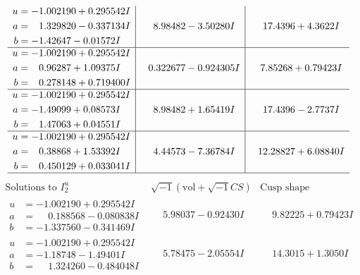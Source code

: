 \documentclass[1p]{elsarticle_modified}
\theoremstyle{definition}
\newcommand{\I}{\sqrt{-1}}
\begin{document}
$$\begin{array}{c|c|c}
\begin{aligned}
u &= -1.002190 + 0.295542 I \\
a &= \phantom{-}1.329820 - 0.337134 I \\
b &= -1.42647 - 0.01572 I\end{aligned}
 & \phantom{-}8.98482 - 3.50280 I & \phantom{-}17.4396 + 4.3622 I \\ \hline\begin{aligned}
u &= -1.002190 + 0.295542 I \\
a &= \phantom{-}0.96287 + 1.09375 I \\
b &= \phantom{-}0.278148 + 0.719400 I\end{aligned}
 & \phantom{-}0.322677 - 0.924305 I & \phantom{-}7.85268 + 0.79423 I \\ \hline\begin{aligned}
u &= -1.002190 + 0.295542 I \\
a &= -1.49099 + 0.08573 I \\
b &= \phantom{-}1.47063 + 0.04551 I\end{aligned}
 & \phantom{-}8.98482 + 1.65419 I & \phantom{-}17.4396 - 2.7737 I \\ \hline\begin{aligned}
u &= -1.002190 + 0.295542 I \\
a &= \phantom{-}0.38868 + 1.53392 I \\
b &= \phantom{-}0.450129 + 0.033041 I\end{aligned}
 & \phantom{-}4.44573 - 7.36784 I & \phantom{-}12.28827 + 6.08840 I\\
 \hline 
 \end{array}$$\newpage$$\begin{array}{c|c|c}  
\text{Solutions to }I^u_{2}& \I (\text{vol} + \sqrt{-1}CS) & \text{Cusp shape}\\
 \hline 
\begin{aligned}
u &= -1.002190 + 0.295542 I \\
a &= \phantom{-}0.188568 - 0.080838 I \\
b &= -1.337560 - 0.341469 I\end{aligned}
 & \phantom{-}5.98037 - 0.92430 I & \phantom{-}9.82225 + 0.79423 I \\ \hline\begin{aligned}
u &= -1.002190 + 0.295542 I \\
a &= -1.18748 - 1.49401 I \\
b &= \phantom{-}1.324260 - 0.484048 I\end{aligned}
 & \phantom{-}5.78475 - 2.05554 I & \phantom{-}14.3015 + 1.3050 I \\ \hline\begin{aligned}

\end{aligned}
\end{array}$$
\end{document}
